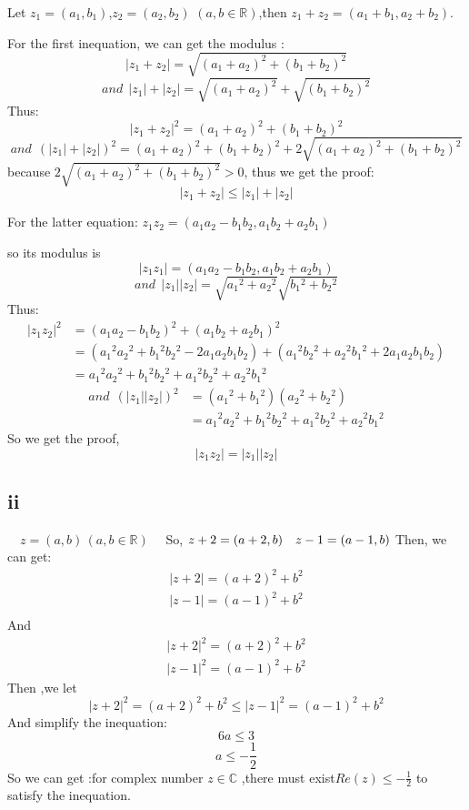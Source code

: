 \documentclass[11pt,twoside,a4paper]{article}
\begin{document}
Let 
$z{_1}=(a{_1},b{_1})$,$z{_2}=(a{_2},b{_2})$ $(a, b \in \mathbb{R})$,then $z{_1}+z{_2}=(a{_1}+b{_1},a{_2}+b{_2})$.\par
For the first inequation, we can get the modulus :
$$|z{_1}+z{_2}|=\sqrt{(a{_1}+a{_2})^2+(b{_1}+b{_2})^2}$$
 $$ and  \ \ |z{_1}|+|z{_2}|=\sqrt{(a{_1}+a{_2})^2}+\sqrt{(b{_1}+b{_2})^2}$$
Thus:
$$|z{_1}+z{_2}|^2=(a{_1}+a{_2})^2+(b{_1}+b{_2})^2$$
 $$ and  \ \ (|z{_1}|+|z{_2}|)^2=(a{_1}+a{_2})^2+(b{_1}+b{_2})^2+2\sqrt{(a{_1}+a{_2})^2+(b{_1}+b{_2})^2}$$
because  $\displaystyle2\sqrt{(a{_1}+a{_2})^2+(b{_1}+b{_2})^2}>0$,
 thus we get the proof:
$$|z{_1}+z{_2}|\le|z{_1}|+|z{_2}|$$
\par\par
For the latter equation:
$z{_1}z{_2}=(a{_1}a{_2}-b{_1}b{_2},a{_1}b{_2}+a{_2}b{_1})$  \par so its modulus is$$\displaystyle|z{_1}z{_1}|=(a{_1}a{_2}-b{_1}b{_2},a{_1}b{_2}+a{_2}b{_1})$$
$$and \ \ |z{_1}||z{_2}|=\displaystyle\sqrt{a{_1}^2+a{_2}^2}\sqrt{b{_1}^2+b{_2}^2}$$
Thus:
\begin{align*}
|z{_1}z{_2}|^2&=(a{_1}a{_2}-b{_1}b{_2})^2+(a{_1}b{_2}+a{_2}b{_1})^2
\\&=(a{_1}^2a{_2}^2+b{_1}^2b{_2}^2-2a{_1}a{_2}b{_1}b{_2})+(a{_1}^2b{_2}^2+a{_2}^2b{_1}^2+2a{_1}a{_2}b{_1}b{_2})
\\&=a{_1}^2a{_2}^2+b{_1}^2b{_2}^2+a{_1}^2b{_2}^2+a{_2}^2b{_1}^2
\end{align*}
\begin{align*}
and \ \ (|z{_1}||z{_2}|)^2&=(a{_1}^2+b{_1}^2)(a{_2}^2+b{_2}^2)\\
&=a{_1}^2a{_2}^2+b{_1}^2b{_2}^2+a{_1}^2b{_2}^2+a{_2}^2b{_1}^2
\end{align*}
So we get the proof,$$|z{_1}z{_2}|=|z{_1}||z{_2}|$$



\subsection{ii}

$\quad z=(a, b)\, (a, b \in \mathbb{R}) \quad $ So, $z+2=(a+2, b) \quad z-1=(a-1, b) \\$
Then, we can get:
\begin{align*}
|z+2|={(a+2)^{2}+b^{2}} \\
|z-1|={(a-1)^{2}+b^{2}} \\
\end{align*}
And
\begin{align*}
|z+2|^{2}=(a+2)^{2}+b^{2} \\
|z-1|^{2}=(a-1)^{2}+b^{2}
\end{align*}
Then ,we let $$|z+2|^{2}=(a+2)^{2}+b^{2}\le|z-1|^{2}=(a-1)^{2}+b^{2}$$
And simplify the inequation:
$$6a\le3$$ $$  a\le -\frac{1}{2}$$
So we can get :for complex number $z \in \mathbb{C}$ ,there must exist$\displaystyle Re(z)\le-\frac{1}{2}$ to satisfy the inequation.
\end{document}
